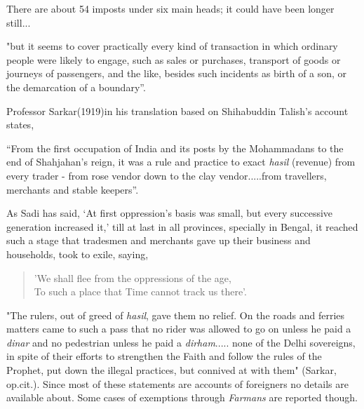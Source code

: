 There are about 54 imposts under six main heads; it could have been longer still...

\begin{myquote}
"but it seems to cover practically every kind of transaction in which ordinary people were likely to engage, such as sales or purchases, transport of goods or journeys of passengers, and the like, besides such incidents as birth of a son, or the demarcation of a boundary''.
\end{myquote}

Professor Sarkar(1919)in his translation based on Shihabuddin Talish's account states,

\begin{myquote}
``From the first occupation of India and its posts by the Mohammadans to the end of Shahjahan's reign, it was a rule and practice to exact \textit{hasil} (revenue) from every trader - from rose vendor down to the clay vendor.....from travellers, merchants and stable keepers''.
\end{myquote}

As Sadi has said, `At first oppression's basis was small, but every successive generation increased it,' till at last in all provinces, specially in Bengal, it reached such a stage that tradesmen and merchants gave up their business and households, took to exile, saying,

\begin{verse}
'We shall flee from the oppressions of the age,\\ To such a place that Time cannot track us there'.
\end{verse}

\begin{myquote}
"The rulers, out of greed of \textit{hasil}, gave them no relief. On the roads and ferries matters came to such a pass that no rider was allowed to go on unless he paid a \textit{dinar} and no pedestrian unless he paid a \textit{dirham}..... none of the Delhi sovereigns, in spite of their efforts to strengthen the Faith and follow the rules of the Prophet, put down the illegal practices, but connived at with them" (Sarkar, op.cit.). Since most of these statements are accounts of foreigners no details are available about. Some cases of exemptions through \textit{Farmans} are reported though.
\end{myquote}

